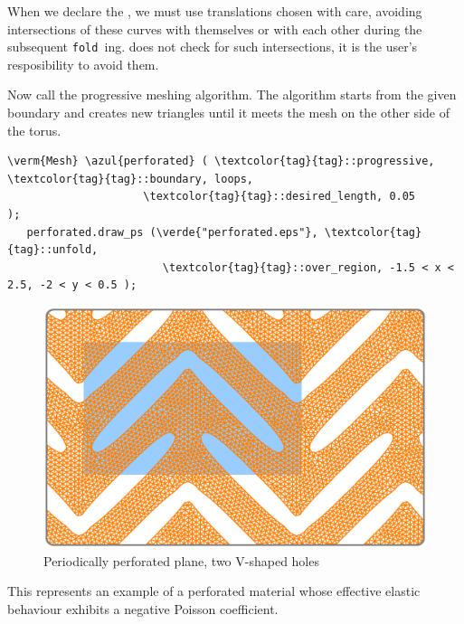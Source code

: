 When we declare the {\small\tt{}}, we must use translations chosen with care,
avoiding intersections of these curves with themselves or with each other during the subsequent
{\small\tt fold\,}ing.
\ManiFEM{} does not check for such intersections, it is the user's resposibility to avoid them.

Now call the progressive meshing algorithm.
The algorithm starts from the given boundary and creates new triangles until
it meets the mesh on the other side of the torus.

\begin{Verbatim}[commandchars=\\\{\},formatcom=\small\tt,frame=single,
   label=code not working,rulecolor=\color{coment},
   baselinestretch=0.94,framesep=2mm                                   ]
   \verm{Mesh} \azul{perforated} ( \textcolor{tag}{tag}::progressive, \textcolor{tag}{tag}::boundary, loops,
                     \textcolor{tag}{tag}::desired_length, 0.05              );
   perforated.draw_ps (\verde{"perforated.eps"}, \textcolor{tag}{tag}::unfold,
                        \textcolor{tag}{tag}::over_region, -1.5 < x < 2.5, -2 < y < 0.5 );
\end{Verbatim}

\begin{figure}[ht] \centering
  \includegraphics[width=130mm]{boomerang-3.eps}
  \caption{Periodically perforated plane, two V-shaped holes}
  \label{\numb section 7.\numb fig 14}
\end{figure}

This represents an example of a perforated material whose effective elastic behaviour
exhibits a negative Poisson coefficient.
